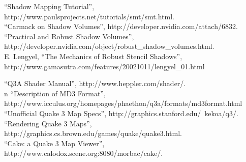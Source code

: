 \documentclass{llncs}
\begin{document}
\begin{multicols}{2}
{\begin{thebibliography}{5}
``Shadow Mapping Tutorial'', http://www.paulsprojects.net/tutorials/smt/smt.html.
\\

``Carmack on Shadow Volumes'', http://developer.nvidia.com/attach/6832.
\\

``Practical and Robust Shadow Volumes'', 
http://developer.nvidia.com/object/robust\_shadow\_volumes.html.
\\

E. Lengyel, ``The Mechanics of Robust Stencil Shadows'', 
http://www.gamasutra.com/features/20021011/lengyel\_01.html

``Q3A Shader Manual'', http://www.heppler.com/shader/.
\\

n
``Description of MD3 Format'', 
http://www.icculus.org/homepages/phaethon/q3a/formats/md3format.html
\\

``Unofficial Quake 3 Map Specs'', http://graphics.stanford.edu/~kekoa/q3/.
\\

``Rendering Quake 3 Maps'', http://graphics.cs.brown.edu/games/quake/quake3.html.
\\

``Cake: a Quake 3 Map Viewer'', http://www.calodox.scene.org:8080/morbac/cake/.
\\

\end{thebibliography}
}
\end{multicols}


\end{document}
